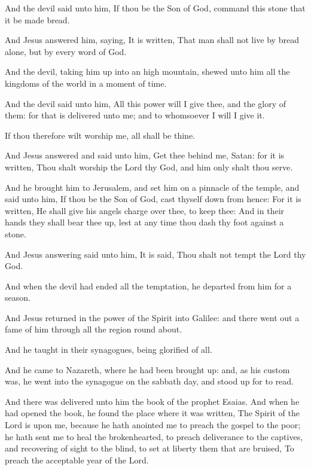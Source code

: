 \verse And the devil said unto him, If thou be the Son of God, command this stone that it be made bread.

\verse And Jesus answered him, saying, It is written, That man shall not live by bread alone, but by every word of God.

\verse And the devil, taking him up into an high mountain, shewed unto him all the kingdoms of the world in a moment of time.

\verse And the devil said unto him, All this power will I give thee, and the glory of them: for that is delivered unto me; and to whomsoever I will I give it.

\verse If thou therefore wilt worship me, all shall be thine.

\verse And Jesus answered and said unto him, Get thee behind me, Satan: for it is written, Thou shalt worship the Lord thy God, and him only shalt thou serve.

\verse And he brought him to Jerusalem, and set him on a pinnacle of the temple, and said unto him, If thou be the Son of God, cast thyself down from hence: \verse For it is written, He shall give his angels charge over thee, to keep thee: \verse And in their hands they shall bear thee up, lest at any time thou dash thy foot against a stone.

\verse And Jesus answering said unto him, It is said, Thou shalt not tempt the Lord thy God.

\verse And when the devil had ended all the temptation, he departed from him for a season.

\verse And Jesus returned in the power of the Spirit into Galilee: and there went out a fame of him through all the region round about.

\verse And he taught in their synagogues, being glorified of all.

\verse And he came to Nazareth, where he had been brought up: and, as his custom was, he went into the synagogue on the sabbath day, and stood up for to read.

\verse And there was delivered unto him the book of the prophet Esaias.  And when he had opened the book, he found the place where it was written, \verse The Spirit of the Lord is upon me, because he hath anointed me to preach the gospel to the poor; he hath sent me to heal the brokenhearted, to preach deliverance to the captives, and recovering of sight to the blind, to set at liberty them that are bruised, \verse To preach the acceptable year of the Lord.

